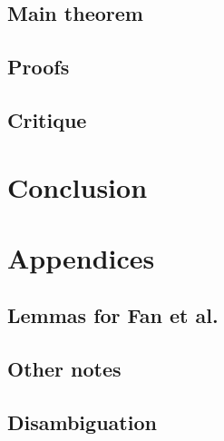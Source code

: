 \documentclass{article}
\begin{document}
\subsection{Main theorem}

\subsection{Proofs}

\subsection{Critique}


\section{Conclusion}


\newpage
\section{Appendices}
\subsection{Lemmas for Fan et al.}

\subsection{Other notes}


\newpage
\subsection{Disambiguation}

\newpage
{}
\end{document}
